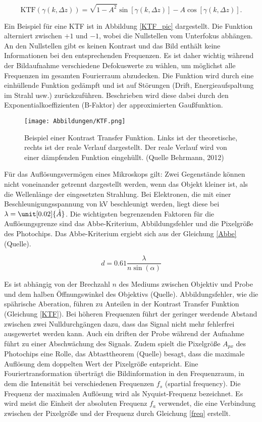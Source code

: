 \begin{equation}
	\text{KTF}(\gamma(k,\Delta z)) = \sqrt{1-A^2} \sin[\gamma(k,\Delta z)] - A \cos[\gamma(k,\Delta z)]. \label{KTF}
\end{equation}

Ein Beispiel für eine KTF ist in Abbildung \ref{KTF_pic} dargestellt.
Die Funktion alterniert zwischen $+1$ und $-1$, wobei die Nullstellen vom Unterfokus abhängen.
An den Nullstellen gibt es keinen Kontrast und das Bild enthält keine Informationen bei den entsprechenden Frequenzen.
Es ist daher wichtig während der Bildaufnahme verschiedene Defokuswerte zu wählen, um möglichst alle Frequenzen im gesamten Fourierraum abzudecken.
Die Funktion wird durch eine einhüllende Funktion gedämpft und ist auf Störungen (Drift, Energieaufspaltung im Strahl usw.) zurückzuführen.
Beschrieben wird diese dabei durch den Exponentialkoeffizienten (B-Faktor) der approximierten Gaußfunktion.

\begin{figure}[h!]
\texttt{[image: Abbildungen/KTF.png]}
\caption[Beispiel der Kontrast Transfer Funktion]{Beispiel einer Kontrast Transfer Funktion. Links ist der theoretische, rechts ist der reale Verlauf dargestellt. Der reale Verlauf wird von einer  dämpfenden Funktion eingehüllt. (Quelle Behrmann,
2012)}
\end{figure}

Für das Auflösungsvermögen eines Mikroskops gilt: Zwei Gegenstände können nicht voneinander getrennt dargestellt werden, wenn das Objekt kleiner ist, als die Wellenlänge der eingesetzten Strahlung.
Bei Elektronen, die mit einer Beschleunigungsspannung von \unit[300]{kV} beschleunigt werden, liegt diese bei $\lambda = \unit[0.02]{\mathring{A}}$.
Die wichtigsten begrenzenden Faktoren für die Auflösungsgrenze sind das Abbe-Kriterium, Abbildungsfehler und die Pixelgröße des Photochips.
Das Abbe-Kriterium ergiebt sich aus der Gleichung \eqref{Abbe} (Quelle).

\begin{equation}
	d = 0.61 \frac{\lambda}{n \sin(\alpha)} \label{Abbe}
\end{equation}

Es ist abhängig von der Brechzahl $n$ des Mediums zwischen Objektiv und Probe und dem halben Öffnungswinkel des Objektivs (Quelle).
Abbildungsfehler, wie die spährische Aberation, führen zu Anteilen in der Kontrast Transfer Funktion (Gleichung \eqref{KTF}).
Bei höheren Frequenzen führt der geringer werdende Abstand zwischen zwei Nulldurchgängen dazu, dass das Signal nicht mehr fehlerfrei ausgewertet werden kann.
Auch ein driften der Probe während der Aufnahme führt zu einer Abschwächung des Signals.
Zudem spielt die Pixelgröße $A_{px}$ des Photochips eine Rolle, das Abtasttheorem (Quelle) besagt, dass die maximale Auflösung dem doppelten Wert der Pixelgröße entspricht.
Eine Fouriertransformation überträgt die Bildinformation in den Frequenzraum, in dem die Intensität bei verschiedenen Frequenzen $f_s$ (spartial frequency).
Die Frequenz der maximalen Auflösung wird als Nyquist-Frequenz bezeichnet.
Es wird meist die Einheit der absoluten Frequenz $f_a$ verwendet, die eine Verbindung zwischen der Pixelgröße und der Frequenz durch Gleichung \eqref{freq} erstellt.

